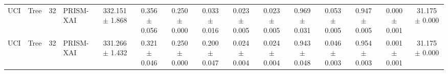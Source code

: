 \begin{table}[t]
\begin{tabular}{llllccccccccccc}
UCI & Tree & 32 & PRISM-XAI & 332.151 $\pm$ 1.868 & 0.356 $\pm$ 0.056 & 0.250 $\pm$ 0.000 & 0.033 $\pm$ 0.016 & 0.023 $\pm$ 0.005 & 0.023 $\pm$ 0.005 & 0.969 $\pm$ 0.031 & 0.053 $\pm$ 0.005 & 0.947 $\pm$ 0.005 & 0.000 $\pm$ 0.001 & 31.175 $\pm$ 0.000 \\
UCI & Tree & 32 & PRISM-XAI & 331.266 $\pm$ 1.432 & 0.321 $\pm$ 0.046 & 0.250 $\pm$ 0.000 & 0.200 $\pm$ 0.047 & 0.024 $\pm$ 0.004 & 0.024 $\pm$ 0.004 & 0.943 $\pm$ 0.048 & 0.046 $\pm$ 0.003 & 0.954 $\pm$ 0.003 & 0.001 $\pm$ 0.001 & 31.175 $\pm$ 0.000 \\
\bottomrule
\end{tabular}
\end{table}
